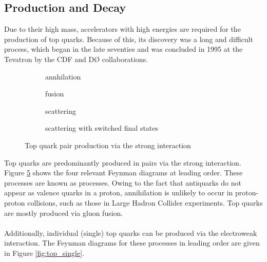 \subsection{Production and Decay}
Due to their high mass, accelerators with high energies are required for the production of top quarks. Because of this, its discovery was a long and difficult process, which began in the late seventies \cite{RevModPhys.69.137} and was concluded in 1995 at the Tevatron by the CDF and D\O{} collaborations.
\begin{figure}
    \centering
    \begin{subfigure}[t]{0.2\textwidth}
        \centering
        
        \caption{\Pquark\APquark annhilation}
        \label{fig:top_pair_qqbar}
    \end{subfigure}\hfill
    \begin{subfigure}[t]{0.2\textwidth}
        \centering
        
        \caption{\Pgluon\Pgluon fusion}
        \label{fig:top_pair_gg}
    \end{subfigure}\hfill
    \begin{subfigure}[t]{0.2\textwidth}
        \centering
        
        \caption{\Pgluon\Pgluon scattering}
        \label{fig:top_pair_gg_scatter}
    \end{subfigure}\hfill
    \begin{subfigure}[t]{0.2\textwidth}
        \centering
        
        \caption{\Pgluon\Pgluon scattering with switched final states}
        \label{fig:top_pair_gg_scatter_switched}
    \end{subfigure}
    \caption{Top quark pair production via the strong interaction}
    \label{fig:top_pair}
\end{figure}
Top quarks are predominantly produced in pairs via the strong interaction. Figure \ref{fig:top_pair} shows the four relevant Feynman diagrams at leading order. These processes are known as \Ptop\APtop processes. Owing to the fact that antiquarks do not appear as valence quarks in a proton, \Pquark\APquark annihilation is unlikely to occur in proton-proton collisions, such as those in Large Hadron Collider experiments. Top quarks are mostly produced via gluon fusion.\\ \\
Additionally, individual (single) top quarks can be produced via the electroweak interaction. The Feynman diagrams for these processes in leading order are given in Figure \ref{fig:top_single}.
